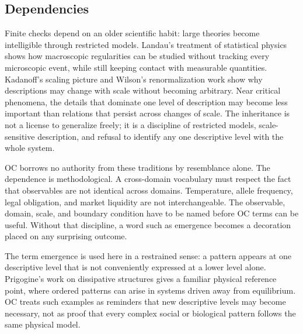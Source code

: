 \documentclass[11pt,a4paper,openany]{book}
\begin{document}
\subsection{Dependencies}
Finite checks depend on an older scientific habit: large theories become intelligible through restricted models. Landau's treatment of statistical physics shows how macroscopic regularities can be studied without tracking every microscopic event, while still keeping contact with measurable quantities. Kadanoff's scaling picture and Wilson's renormalization work show why descriptions may change with scale without becoming arbitrary. Near critical phenomena, the details that dominate one level of description may become less important than relations that persist across changes of scale. The inheritance is not a license to generalize freely; it is a discipline of restricted models, scale-sensitive description, and refusal to identify any one descriptive level with the whole system. \cite{kadanoff_scaling,wilson_renormalization}\par
OC borrows no authority from these traditions by resemblance alone. The dependence is methodological. A cross-domain vocabulary must respect the fact that observables are not identical across domains. Temperature, allele frequency, legal obligation, and market liquidity are not interchangeable. The observable, domain, scale, and boundary condition have to be named before OC terms can be useful. Without that discipline, a word such as emergence becomes a decoration placed on any surprising outcome.\par
The term emergence is used here in a restrained sense: a pattern appears at one descriptive level that is not conveniently expressed at a lower level alone. Prigogine's work on dissipative structures gives a familiar physical reference point, where ordered patterns can arise in systems driven away from equilibrium. OC treats such examples as reminders that new descriptive levels may become necessary, not as proof that every complex social or biological pattern follows the same physical model.\par
\end{document}
